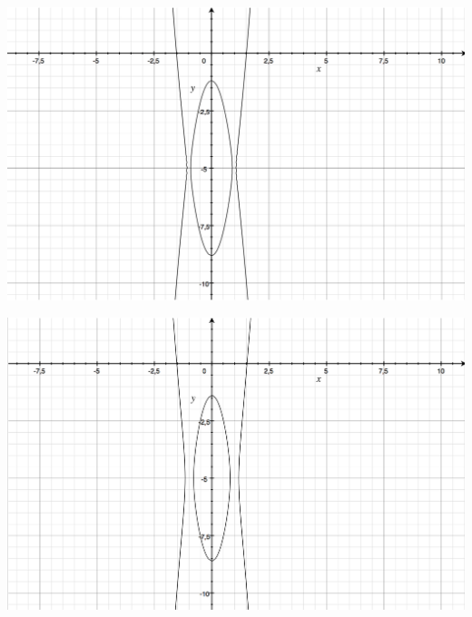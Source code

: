 \documentclass[a4paper, 12pt]{article}   	%
\begin{document}
    \begin{center}
        \begin{minipage}{0.47\linewidth}
            \includegraphics[width=\linewidth]{img/1_r1}
        \end{minipage}
        \begin{minipage}{0.47\linewidth}
            \includegraphics[width=\linewidth]{img/1_r2}
        \end{minipage}
        

\end{center}
\end{document}
